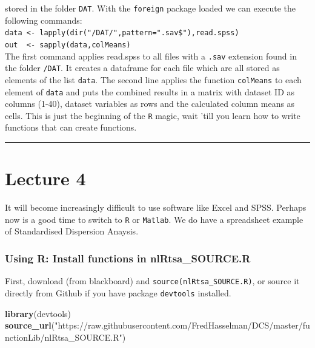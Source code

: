 \documentclass[]{book}
\newenvironment{Shaded}{\begin{snugshade}}{\end{snugshade}}
\newcommand{\KeywordTok}[1]{\textcolor[rgb]{0.13,0.29,0.53}{\textbf{{#1}}}}
\newcommand{\StringTok}[1]{\textcolor[rgb]{0.31,0.60,0.02}{{#1}}}
\newcommand{\NormalTok}[1]{{#1}}
\begin{document}
\begin{enumerate}
  stored in the folder \texttt{DAT}. With the \texttt{foreign} package
  loaded we can execute the following commands:\\
  \texttt{data\ \textless{}-\ lapply(dir("/DAT/",pattern=".sav\$"),read.spss)}\\
  \texttt{out\ \ \textless{}-\ sapply(data,colMeans)}\\
  The first command applies read.spss to all files with a \texttt{.sav}
  extension found in the folder \texttt{/DAT}. It creates a dataframe
  for each file which are all stored as elements of the list
  \texttt{data}. The second line applies the function \texttt{colMeans}
  to each element of \texttt{data} and puts the combined results in a
  matrix with dataset ID as columns (1-40), dataset variables as rows
  and the calculated column means as cells. This is just the beginning
  of the \texttt{R} magic, wait 'till you learn how to write functions
  that can create functions.
\end{enumerate}

\begin{center}\rule{0.5\linewidth}{\linethickness}\end{center}

\hypertarget{lecture-4}{\chapter*{Lecture 4}\label{lecture-4}}

It will become increasingly difficult to use software like Excel and
SPSS. Perhaps now is a good time to switch to \texttt{R} or
\texttt{Matlab}. We do have a spreadsheet example of Standardised
Dispersion Anaysis.

\subsection*{Using R: Install functions in
nlRtsa\_SOURCE.R}\label{using-r-install-functions-in-nlrtsa_source.r}

First, download (from blackboard) and
\texttt{source(\textquotesingle{}nlRtsa\_SOURCE.R\textquotesingle{})},
or source it directly from Github if you have package \texttt{devtools}
installed.

\begin{Shaded}
\begin{Highlighting}[]
\KeywordTok{library}\NormalTok{(devtools)}
\KeywordTok{source_url}\NormalTok{(}\StringTok{"https://raw.githubusercontent.com/FredHasselman/DCS/master/functionLib/nlRtsa_SOURCE.R"}\NormalTok{)}
\end{Highlighting}
\end{Shaded}
\end{document}
